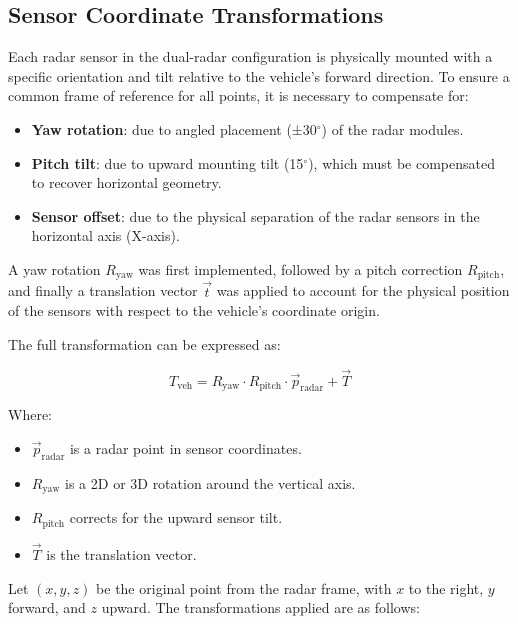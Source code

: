 \subsection{Sensor Coordinate Transformations}
\label{subsec:transformations}

Each radar sensor in the dual-radar configuration is physically mounted with a specific orientation and tilt relative to the vehicle's forward direction. 
To ensure a common frame of reference for all points, it is necessary to compensate for:

\begin{itemize}
    \item \textbf{Yaw rotation}: due to angled placement (±30$^\circ$) of the radar modules.
    \item \textbf{Pitch tilt}: due to upward mounting tilt (15$^\circ$), which must be compensated to recover horizontal geometry.
    \item \textbf{Sensor offset}: due to the physical separation of the radar sensors in the horizontal axis (X-axis).
\end{itemize}

A yaw rotation \( R_{\text{yaw}} \) was first implemented, followed by a pitch correction \( R_{\text{pitch}} \), and finally a translation vector \( \vec{t} \) was applied to account for the physical position of the sensors with respect to the vehicle's coordinate origin.

The full transformation can be expressed as:

\begin{equation}
T_{\text{veh}} = R_{\text{yaw}} \cdot R_{\text{pitch}} \cdot \vec{p}_{\text{radar}} + \vec{T}
\label{eq:radar_to_vehicle_transform}
\end{equation}

Where:
\begin{itemize}
    \item \( \vec{p}_{\text{radar}} \) is a radar point in sensor coordinates.
    \item \( R_{\text{yaw}} \) is a 2D or 3D rotation around the vertical axis.
    \item \( R_{\text{pitch}} \) corrects for the upward sensor tilt.
    \item \( \vec{T} \) is the translation vector.
\end{itemize}

\vspace{1em}

Let $(x, y, z)$ be the original point from the radar frame, with $x$ to the right, $y$ forward, and $z$ upward. 
The transformations applied are as follows:

